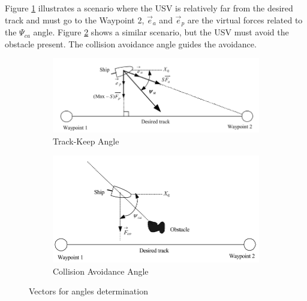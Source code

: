     Figure \ref{fig:Lee2004Fuzzy_tkAngle} illustrates a scenario where the \ac{USV} is relatively far from the desired track and must go to the Waypoint 2, $\vec{e}_a$  and $\vec{e}_p$ are the virtual forces related to the $\Psi_{ca}$ angle. Figure \ref{fig:Lee2004Fuzzy_caAngle} shows a similar scenario, but the \ac{USV} must avoid the obstacle present. The collision avoidance angle guides the avoidance.
    \begin{figure}[H]
    \centering
        \begin{subfigure}[b]{0.5\textwidth}
            \centering
            \includegraphics[width=\textwidth]{figs/Chap3/Lee2004Fuzzy_tkAngle.png}
            \caption{Track-Keep Angle}
            \label{fig:Lee2004Fuzzy_tkAngle}
        \end{subfigure}
        \begin{subfigure}[b]{0.4\textwidth}
            \centering
            \includegraphics[width=\textwidth]{figs/Chap3/Lee2004Fuzzy_caAngle.png}
            \caption{Collision Avoidance Angle}
            \label{fig:Lee2004Fuzzy_caAngle}
        \end{subfigure}
    
    \caption{Vectors for angles determination \cite{Lee2004Fuzzy}}
    \label{fig:Lee2004Fuzzy_Angles}
    \end{figure}
    
